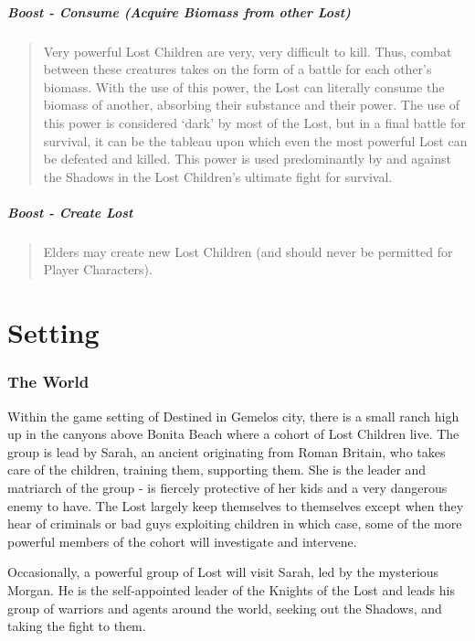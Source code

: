 \documentclass[letterpaper,serif]{rpg-module}
\begin{document}
\subsubsection{Boost - Consume (Acquire Biomass from other Lost)} 

\begin{quote}
Very powerful Lost Children are very, very difficult to kill. Thus, combat between these creatures takes on the form of a battle for each other's biomass. With the use of this power, the Lost can literally consume the biomass of another, absorbing their substance and their power. The use of this power is considered `dark' by most of the Lost, but in a final battle for survival, it can be the tableau upon which even the most powerful Lost can be defeated and killed. This power is used predominantly by and against the Shadows in the Lost Children's ultimate fight for survival.  
\end{quote}

\subsubsection{Boost - Create Lost}
\begin{quote}
Elders may create new Lost Children (and should never be permitted for Player Characters). 
\end{quote}

\newpage

\part{Setting}
\label{setting}

\section{The World}

Within the game setting of Destined in Gemelos city, there is a small ranch high up in the canyons above Bonita Beach where a cohort of Lost Children live. The group is lead by Sarah, an ancient originating from Roman Britain, who takes care of the children, training them, supporting them. She is the leader and matriarch of the group - is fiercely protective of her kids and a very dangerous enemy to have. The Lost largely keep themselves to themselves except when they hear of criminals or bad guys exploiting children in which case, some of the more powerful members of the cohort will investigate and intervene. 

Occasionally, a powerful group of Lost will visit Sarah, led by the mysterious Morgan. He is the self-appointed leader of the Knights of the Lost and leads his group of warriors and agents around the world, seeking out the Shadows, and taking the fight to them. 
\end{document}
